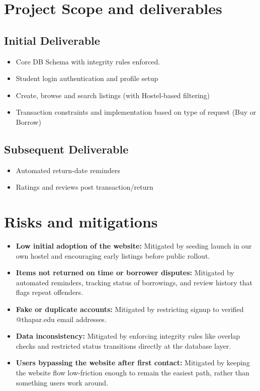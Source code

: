 \documentclass[12pt,a4paper]{article}
\begin{document}
\section{Project Scope and deliverables}
\subsection{Initial Deliverable}
\begin{itemize}[leftmargin=0.7cm]
    \item Core DB Schema with integrity rules enforced.
    \item Student login authentication and profile setup
    \item Create, browse and search listings (with Hostel-based filtering)
    \item Transaction constraints and implementation based on type of request (Buy or Borrow)
\end{itemize}
\subsection{Subsequent Deliverable}
\begin{itemize}
    \item Automated return-date reminders
    \item Ratings and reviews post transaction/return
\end{itemize}

\section{Risks and mitigations}
\begin{itemize}
    \item \textbf{Low initial adoption of the website:} Mitigated by seeding launch in our own hostel and encouraging early listings before public rollout.
    \item \textbf{Items not returned on time or borrower disputes:} Mitigated by automated reminders, tracking status of borrowings, and review history that flags repeat offenders.
    \item \textbf{Fake or duplicate accounts:} Mitigated by restricting signup to verified @thapar.edu email addresses.
    \item \textbf{Data inconsistency:} Mitigated by enforcing integrity rules like overlap checks and restricted status transitions directly at the database layer.
    \item \textbf{Users bypassing the website after first contact:} Mitigated by keeping the website flow low-friction enough to remain the easiest path, rather than something users work around.
\end{itemize}
\end{document}
